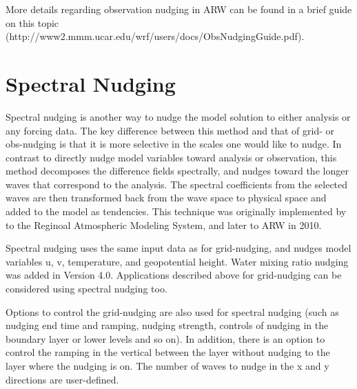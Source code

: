 More details regarding observation nudging in ARW can be found in a brief guide on this topic (http://www2.mmm.ucar.edu/wrf/users/docs/ObsNudgingGuide.pdf). 

 
\section{Spectral Nudging}

Spectral nudging is another way to nudge the model solution to either analysis or any forcing data. The key difference between this method and that of grid- or obs-nudging is that it is more selective in the scales one would like to nudge. In contrast to directly nudge model variables toward analysis or observation, this method decomposes the difference fields spectrally, and nudges toward the longer waves that correspond to the analysis. The spectral coefficients from the selected waves are then transformed back from the wave space to physical space and added to the model as tendencies. This technique was originally implemented by \citet{miguez04} to the Reginoal Atmospheric Modeling System, and later to ARW in 2010.

Spectral nudging uses the same input data as for grid-nudging, and nudges model variables u, v, temperature, and geopotential height. Water mixing ratio nudging was added in Version 4.0. Applications described above for grid-nudging can be considered using spectral nudging too.

Options to control the grid-nudging are also used for spectral nudging (such as nudging end time and ramping, nudging strength, controls of nudging in the boundary layer or lower levels and so on). In addition, there is an option to control the ramping in the vertical between the layer without nudging to the layer where the nudging is on. The number of waves to nudge in the x and y directions are user-defined.

